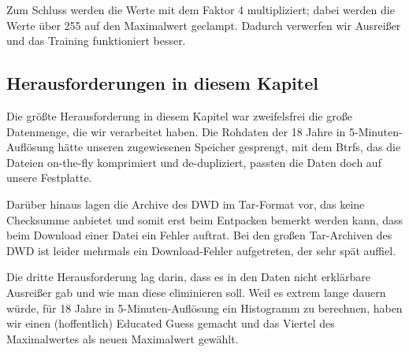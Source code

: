 Zum Schluss werden die Werte mit dem Faktor 4 multipliziert; dabei werden die Werte über 255 auf den Maximalwert geclampt. Dadurch verwerfen wir Ausreißer und das Training funktioniert besser.

\subsection{Herausforderungen in diesem Kapitel}
Die größte Herausforderung in diesem Kapitel war zweifelsfrei die große Datenmenge, die wir verarbeitet haben. Die Rohdaten der 18 Jahre in 5-Minuten-Auflösung hätte unseren zugewiesenen Speicher gesprengt, mit dem Btrfs, das die Dateien on-the-fly komprimiert und de-dupliziert, passten die Daten doch auf unsere Festplatte.

Darüber hinaus lagen die Archive des DWD im Tar-Format vor, das keine Checksumme anbietet und somit erst beim Entpacken bemerkt werden kann, dass beim Download einer Datei ein Fehler auftrat. Bei den großen Tar-Archiven des DWD ist leider mehrmals ein Download-Fehler aufgetreten, der sehr spät auffiel.

Die dritte Herausforderung lag darin, dass es in den Daten nicht erklärbare Ausreißer gab und wie man diese eliminieren soll. Weil es extrem lange dauern würde, für 18 Jahre in 5-Minuten-Auflösung ein Histogramm zu berechnen, haben wir einen (hoffentlich) Educated Guess gemacht und das Viertel des Maximalwertes als neuen Maximalwert gewählt.
